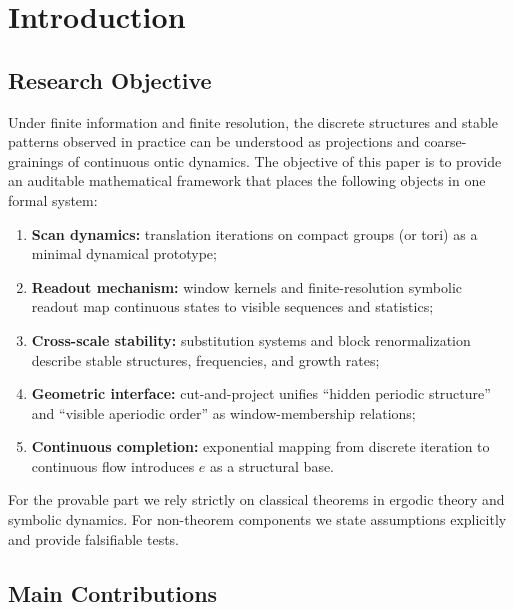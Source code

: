 ﻿\section{Introduction}

\subsection{Research Objective}

Under finite information and finite resolution, the discrete structures and stable patterns observed in practice can be understood as projections and coarse-grainings of continuous ontic dynamics. The objective of this paper is to provide an auditable mathematical framework that places the following objects in one formal system:
\begin{enumerate}
  \item \textbf{Scan dynamics:} translation iterations on compact groups (or tori) as a minimal dynamical prototype;
  \item \textbf{Readout mechanism:} window kernels and finite-resolution symbolic readout map continuous states to visible sequences and statistics;
  \item \textbf{Cross-scale stability:} substitution systems and block renormalization describe stable structures, frequencies, and growth rates;
  \item \textbf{Geometric interface:} cut-and-project unifies ``hidden periodic structure'' and ``visible aperiodic order'' as window-membership relations;
  \item \textbf{Continuous completion:} exponential mapping from discrete iteration to continuous flow introduces $e$ as a structural base.
\end{enumerate}
For the provable part we rely strictly on classical theorems in ergodic theory and symbolic dynamics. For non-theorem components we state assumptions explicitly and provide falsifiable tests.

\subsection{Main Contributions}

